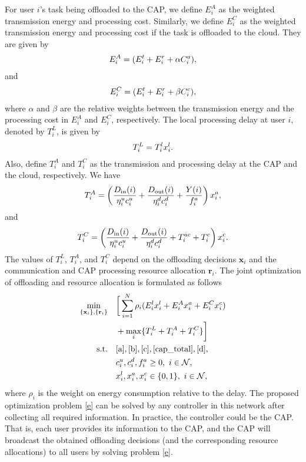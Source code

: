 \documentclass[10pt,journal,compsoc]{IEEEtran}
\begin{document}
For user $i$'s task being offloaded to the CAP, we define $E^A_i$ as
the weighted transmission energy and processing cost. Similarly, we
define $E_i^C$ as the weighted transmission energy and processing
cost if the task is offloaded to the cloud. They are given by
\begin{align}
E^A_i=(E^t_{i}+E^r_{i}+\alpha C^a_{i}),\allowdisplaybreaks\nonumber
\end{align}
and
\begin{align}
E^C_i=(E^t_{i}+E^r_{i}+\beta C^c_{i}),\allowdisplaybreaks\nonumber
\end{align}
where $\alpha$ and $\beta$ are the relative weights between the
transmission energy and the processing cost in $E_i^A$ and $E_i^C$,
respectively. The local processing delay at user $i$, denoted by
$T^L_{i}$, is given by
\begin{align}
T^L_{i}= T^l_{i}x^l_{i}.\allowdisplaybreaks\nonumber
\end{align}
Also, define $T^A_{i}$ and $T^C_{i}$ as the transmission and
processing delay at the CAP and the cloud, respectively. We have
\begin{align}
T^A_{i}=\left(\frac{D_{{\textrm{in}}}(i)}{\eta^u_ic^u_{i}}+\frac{D_{{\textrm{out}}}(i)}{\eta^d_ic^d_{i}}+\frac{Y(i)}{f^a_i}\right)x^a_{i},\allowdisplaybreaks\nonumber
\end{align}
and
\begin{align}
T^C_{i}=\left(\frac{D_{{\textrm{in}}}(i)}{\eta^u_ic^u_{i}}+\frac{D_{{\textrm{out}}}(i)}{\eta^d_ic^d_{i}}+T^{ac}_i+T^{c}_i\right)x^c_{i}.\allowdisplaybreaks\nonumber
\end{align}
The values of $T^L_{i}$, $T^A_{i}$, and $T^C_{i}$ depend on the
offloading decisions $\mathbf{x}_i$ and the communication and CAP
processing resource allocation $\textbf{r}_i$. The joint
optimization of offloading and resource allocation is formulated as
follows
\begin{align}
\min\limits_{\{ \mathbf{x}_i \}, \{ \mathbf{r}_i \} }
&\quad \bigg[\sum_{i=1}^N\rho_i(E^l_{i}x^l_{i}+E^A_ix^a_{i}+E^C_ix^c_{i})\nonumber\\
&\quad +\max_{i}\{T^L_{i}+T^A_{i}+T^C_{i}\}\bigg]\label{e}\allowdisplaybreaks\\
\text{s.t.} &\quad \eqref{a},\eqref{b},\eqref{c},\eqref{cap_total},\eqref{d},\nonumber\\
&\quad c^u_{i}, c^d_{i}, f^a_{i} \geq 0,\ i\in\mathcal{N},\label{f}\allowdisplaybreaks\\
&\quad x^l_{i}, x^a_{i}, x^c_{i} \in \{0,1\},\
i\in\mathcal{N},\label{g}
\end{align}
where $\rho_i$ is the weight on energy consumption relative to the
delay. The proposed optimization problem \eqref{e} can be solved by any controller in this network after
collecting all required information. In practice, the controller
could be the CAP. That is, each user provides its information
to the CAP, and the CAP will broadcast the obtained offloading
decisions (and the corresponding resource allocations) to all users
by solving problem \eqref{e}.
\end{document}
